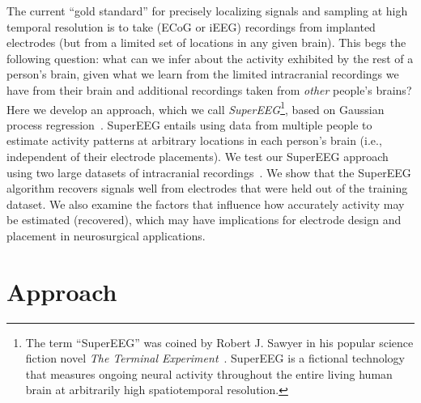 \documentclass[11pt]{article}
\begin{document}
The current ``gold standard'' for precisely localizing signals and sampling at
high temporal resolution is to take (ECoG or iEEG) recordings from implanted
electrodes (but from a limited set of locations in any given brain).  This begs
the following question: what can we infer about the activity exhibited by the
rest of a person's brain, given what we learn from the limited intracranial
recordings we have from their brain and additional recordings taken from
\textit{other} people's brains?  Here we develop an approach, which we call
\textit{SuperEEG}\footnote{The term ``SuperEEG'' was coined by Robert J. Sawyer
in his popular science fiction novel \textit{The Terminal
Experiment}~\citep{Sawy95}.  SuperEEG is a fictional technology that measures
ongoing neural activity throughout the entire living human brain at arbitrarily
high spatiotemporal resolution.}, based on Gaussian process
regression~\citep{Rasm06}.  SuperEEG entails using data from multiple people to
estimate activity patterns at arbitrary locations in each person's brain (i.e.,
independent of their electrode placements).  We test our SuperEEG approach using
two large datasets of intracranial recordings~\citep{SedeEtal03, SedeEtal07a,
SedeEtal07b, MannEtal11, MannEtal12, EzzyEtal17, HoraEtal17, KragEtal17,
KuceEtal17, LinEtal17, SoloEtal18, WeidEtal18, EzzyEtal18, KuceEtal18}.  We show
that the SuperEEG algorithm recovers signals well from electrodes that were held
out of the training dataset.  We also examine the factors that influence how
accurately activity may be estimated (recovered), which may have implications
for electrode design and placement in neurosurgical applications.

\section*{Approach}
\end{document}
